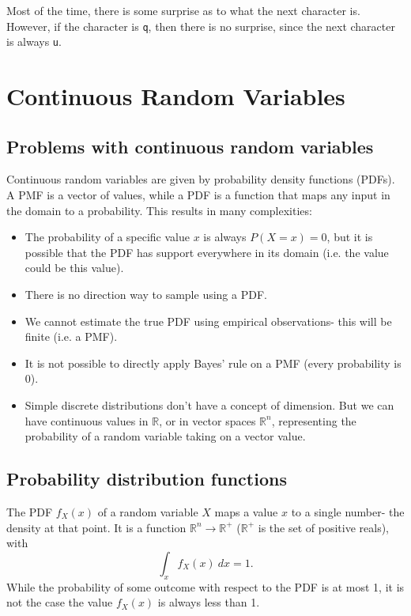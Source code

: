 \documentclass[a4paper, openany]{memoir}
\begin{document}
\noindent Most of the time, there is some surprise as to what the next character is. However, if the character is \texttt{q}, then there is no surprise, since the next character is always \texttt{u}.
\newpage

\section{Continuous Random Variables}
\subsection{Problems with continuous random variables}
Continuous random variables are given by probability density functions (PDFs). A PMF is a vector of values, while a PDF is a function that maps any input in the domain to a probability. This results in many complexities:
\begin{itemize}
    \item The probability of a specific value $x$ is always $P(X = x) = 0$, but it is possible that the PDF has support everywhere in its domain (i.e. the value could be this value).
    \item There is no direction way to sample using a PDF.
    \item We cannot estimate the true PDF using empirical observations- this will be finite (i.e. a PMF).
    \item It is not possible to directly apply Bayes' rule on a PMF (every probability is 0).
    \item Simple discrete distributions don't have a concept of dimension. But we can have continuous values in $\mathbb{R}$, or in vector spaces $\mathbb{R}^n$, representing the probability of a random variable taking on a vector value.
\end{itemize}

\subsection{Probability distribution functions}
The PDF $f_X(x)$ of a random variable $X$ maps a value $x$ to a single number- the density at that point. It is a function $\mathbb{R}^n \to \mathbb{R}^+$ ($\mathbb{R}^+$ is the set of positive reals), with
\[\int_x f_X(x) \ dx = 1.\]
While the probability of some outcome with respect to the PDF is at most 1, it is not the case the value $f_X(x)$ is always less than 1.
\end{document}
